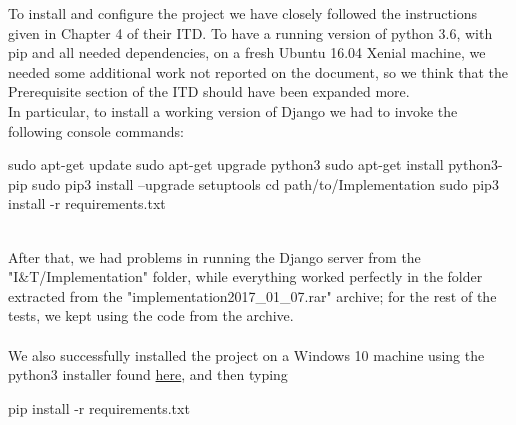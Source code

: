 
To install and configure the project we have closely followed the instructions given in Chapter 4 of their ITD. To have a running version of python 3.6, with pip and all needed dependencies, on a fresh Ubuntu 16.04 Xenial machine, we needed some additional work not reported on the document, so we think that the Prerequisite section of the ITD should have been expanded more. \\
In particular, to install a working version of Django we had to invoke the following console commands: \\

\begin{commandshell}
sudo apt-get update
sudo apt-get upgrade python3
sudo apt-get install python3-pip
sudo pip3 install --upgrade setuptools
cd path/to/Implementation
sudo pip3 install -r requirements.txt
\end{commandshell}
~\\
After that, we had problems in running the Django server from the "I\&T/Implementation" folder, while everything worked perfectly in the folder extracted from the "implementation2017\_01\_07.rar" archive; for the rest of the tests, we kept using the code from the archive. \\
~\\
We also successfully installed the project on a Windows 10 machine using the python3 installer found \href{https://www.python.it/download/}{here}, and then typing 
\begin{commandshell}
pip install -r requirements.txt
\end{commandshell}